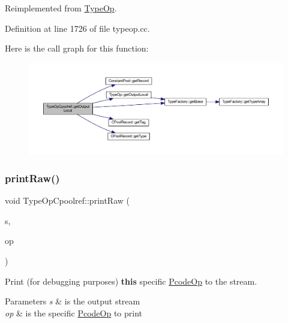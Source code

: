 Reimplemented from \mbox{\hyperlink{class_type_op_a3454cadfb15f6794829123a7ecfe38f5}{Type\+Op}}.



Definition at line 1726 of file typeop.\+cc.

Here is the call graph for this function\+:
\nopagebreak
\begin{figure}[H]
\begin{center}
\leavevmode
\includegraphics[width=350pt]{class_type_op_cpoolref_af6f8c8b7ce807d7773e55820c11a08f1_cgraph}
\end{center}
\end{figure}
\mbox{\label{class_type_op_cpoolref_a3368bf134c942c37c4c3080b82b069f6}} 
\subsubsection{\texorpdfstring{printRaw()}{printRaw()}}
{\footnotesize\ttfamily void Type\+Op\+Cpoolref\+::print\+Raw (\begin{DoxyParamCaption}\item[{ostream \&}]{s,  }\item[{const \mbox{\hyperlink{class_pcode_op}{Pcode\+Op}} $\ast$}]{op }\end{DoxyParamCaption})\hspace{0.3cm}{\ttfamily [virtual]}}



Print (for debugging purposes) {\bfseries{this}} specific \mbox{\hyperlink{class_pcode_op}{Pcode\+Op}} to the stream. 


\begin{DoxyParams}{Parameters}
{\em s} & is the output stream \\
\hline
{\em op} & is the specific \mbox{\hyperlink{class_pcode_op}{Pcode\+Op}} to print \\
\hline
\end{DoxyParams}


